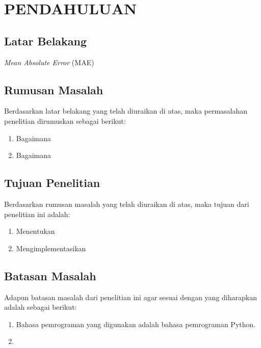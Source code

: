 \newpage
\pagestyle{fancy}
\fancyhf{}
\fancyhead[R]{\thepage}
\chapter{PENDAHULUAN} \label{Bab I}

\section{Latar Belakang} \label{I.Latar Belakang}
\textit{Mean Absolute Error} (MAE) \cite{Suryanto2019MAE}
\lipsum[1-3] %


\section{Rumusan Masalah} \label{I.Rumusan Masalah}

Berdasarkan latar belakang yang telah diuraikan di atas, maka permasalahan penelitian dirumuskan sebagai berikut: \par

\begin{enumerate}[noitemsep]
	\item Bagaimana
	\item Bagaimana 
\end{enumerate}


\section{Tujuan Penelitian} \label{I.Tujuan}
Berdasarkan rumusan masalah yang telah diuraikan di atas, maka tujuan dari penelitian ini adalah: \par

\begin{enumerate}[noitemsep]
	\item Menentukan 
	\item Mengimplementasikan
\end{enumerate}


\section{Batasan Masalah} \label{I.Batasan}
Adapun batasan masalah dari penelitian ini agar sesuai dengan yang diharapkan adalah sebagai berikut: \par

\begin{enumerate}[noitemsep]
    \item Bahasa pemrograman yang digunakan adalah bahasa pemrograman Python.
    \item 
\end{enumerate}


